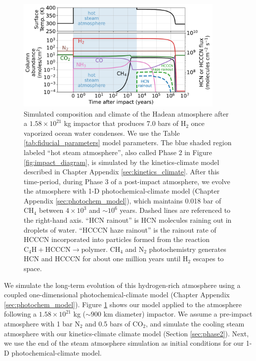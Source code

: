 \begin{figure}
  \centering
  \includegraphics[width=0.9\textwidth]{tex/5impacts/figures/Figure4.pdf}
  \caption{Simulated composition and climate of the Hadean atmosphere after a $1.58 \times 10^{21}$ kg impactor that produces 7.0 bars of H$_2$ once vaporized ocean water condenses. We use the Table \ref{tab:fiducial_parameters} model parameters. The blue shaded region labeled ``hot steam atmosphere'', also called Phase 2 in Figure \ref{fig:impact_diagram}, is simulated by the kinetics-climate model described in Chapter Appendix \ref{sec:kinetics_climate}. After this time-period, during Phase 3 of a post-impact atmosphere, we evolve the atmosphere with 1-D photochemical-climate model (Chapter Appendix \ref{sec:photochem_model}), which maintains 0.018 bar of CH$_4$ between $4 \times 10^3$ and $\sim 10^6$ years. Dashed lines are referenced to the right-hand axis. ``HCN rainout'' is HCN molecules raining out in droplets of water. ``HCCCN haze rainout'' is the rainout rate of HCCCN incorporated into particles formed from the reaction $\mathrm{C_4H} + \mathrm{HCCCN} \rightarrow \mathrm{polymer}$. CH$_4$ and N$_2$ photochemistry generates HCN and HCCCN for about one million years until H$_2$ escapes to space.}
  \label{fig:figure4}
\end{figure}

We simulate the long-term evolution of this hydrogen-rich atmosphere using a coupled one-dimensional photochemical-climate model (Chapter Appendix \ref{sec:photochem_model}). Figure \ref{fig:figure4} shows our model applied to the atmosphere following a $1.58 \times 10^{21}$ kg ($\sim 900$ km diameter) impactor. We assume a pre-impact atmosphere with 1 bar N$_2$ and 0.5 bars of CO$_2$, and simulate the cooling steam atmosphere with our kinetics-climate climate model (Section \ref{sec:phase2}). Next, we use the end of the steam atmosphere simulation as initial conditions for our 1-D photochemical-climate model. 

